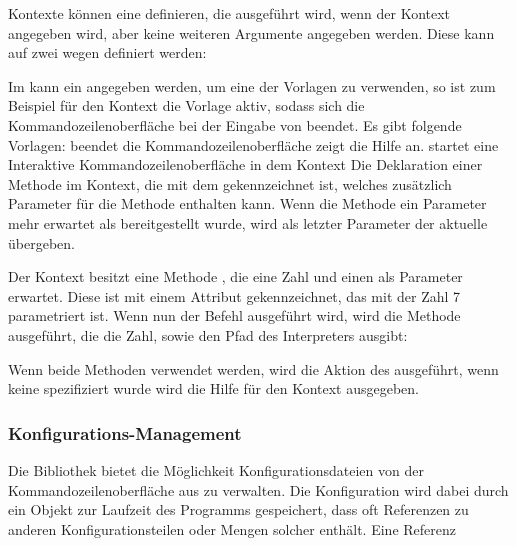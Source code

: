 Kontexte können eine  definieren, die ausgeführt wird, wenn der Kontext angegeben wird, aber keine weiteren Argumente angegeben werden.
Diese kann auf zwei wegen definiert werden:
\begin{outline}
 \1 Im  kann ein  angegeben werden, um eine der Vorlagen zu verwenden, 
 so ist zum Beispiel für den  Kontext die  Vorlage aktiv,
 sodass sich die Kommandozeilenoberfläche bei der Eingabe von  beendet.
 Es gibt folgende Vorlagen:
 \2  beendet die Kommandozeilenoberfläche
 \2  zeigt die Hilfe an.
 \2  startet eine Interaktive Kommandozeilenoberfläche in dem Kontext 
 \1 Die Deklaration einer Methode im Kontext, die mit dem  gekennzeichnet ist,
 welches zusätzlich Parameter für die Methode enthalten kann.
 Wenn die Methode ein Parameter mehr erwartet als bereitgestellt wurde, wird als letzter Parameter der aktuelle  übergeben.
 
 Der  Kontext besitzt eine Methode , die eine Zahl und einen  als Parameter erwartet.
 Diese ist mit einem  Attribut gekennzeichnet, das mit der Zahl 7 parametriert ist.
 Wenn nun der Befehl  ausgeführt wird, wird die  Methode ausgeführt, die die Zahl, sowie den Pfad des Interpreters ausgibt:
\end{outline}
 Wenn beide Methoden verwendet werden, wird die Aktion des  ausgeführt, wenn keine spezifiziert wurde wird die Hilfe für den Kontext ausgegeben.

\subsubsection{Konfigurations-Management}\label{ConfigurationManagement}
Die Bibliothek bietet die Möglichkeit Konfigurationsdateien von der Kommandozeilenoberfläche aus zu verwalten.
Die Konfiguration wird dabei durch ein Objekt zur Laufzeit des Programms gespeichert, dass oft Referenzen zu anderen Konfigurationsteilen oder Mengen solcher enthält.
Eine Referenz

